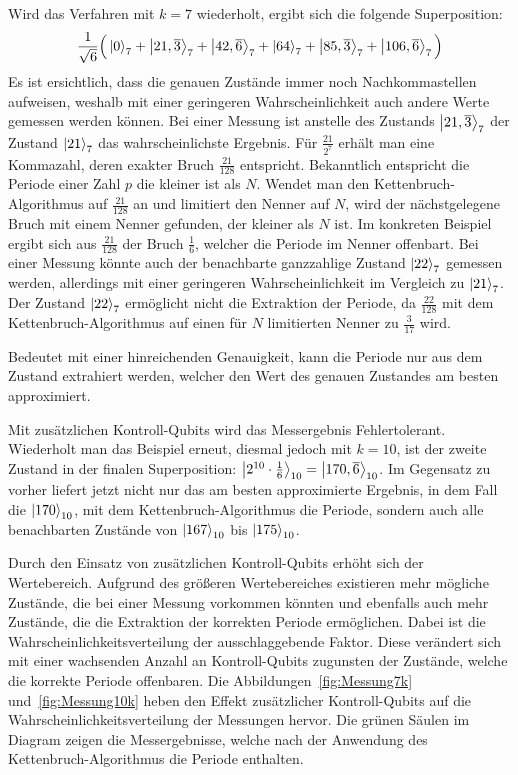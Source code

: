 Wird das Verfahren mit \(k=7\) wiederholt, ergibt sich die folgende Superposition:
\[\frac{1}{\sqrt{6}}
\Big(\ket{0}_7 +\ket{21,\overline{3}}_7 + \ket{42,\overline{6}}_7+
\ket{64}_7+\ket{85,\overline{3}}_7 + \ket{106,\overline{6}}_7
\Big) \]
Es ist ersichtlich, dass die genauen Zustände immer noch Nachkommastellen aufweisen, 
weshalb mit einer geringeren Wahrscheinlichkeit auch andere Werte gemessen werden können.
Bei einer Messung ist anstelle des Zustands \(\ket{21,\overline{3}}_7\) der Zustand \(\ket{21}_7\) das wahrscheinlichste Ergebnis.
Für \(\frac{21}{2^{7}}\) erhält man eine Kommazahl, deren exakter Bruch \(\frac{21}{128}\) entspricht.
Bekanntlich entspricht die Periode einer Zahl \(p\) die kleiner ist als \(N\).
Wendet man den Kettenbruch-Algorithmus auf \(\frac{21}{128}\) an und limitiert den Nenner auf \(N\), 
wird der nächstgelegene Bruch mit einem Nenner gefunden, der kleiner als \(N\) ist.
Im konkreten Beispiel ergibt sich aus \(\frac{21}{128}\) der Bruch \(\frac{1}{6}\), 
welcher die Periode im Nenner offenbart.
Bei einer Messung könnte auch der benachbarte ganzzahlige Zustand \(\ket{22}_7\) gemessen werden, 
allerdings mit einer geringeren Wahrscheinlichkeit im Vergleich zu \(\ket{21}_7\).
Der Zustand \(\ket{22}_7\) ermöglicht nicht die Extraktion der Periode, 
da \(\frac{22}{128}\) mit dem Kettenbruch-Algorithmus auf einen für \(N\) limitierten Nenner
zu \(\frac{3}{17}\) wird.

Bedeutet mit einer hinreichenden Genauigkeit, kann die Periode nur aus dem Zustand extrahiert werden, 
welcher den Wert des genauen Zustandes am besten approximiert.

Mit zusätzlichen Kontroll-Qubits wird das Messergebnis Fehlertolerant.
Wiederholt man das Beispiel erneut, diesmal jedoch mit \(k=10\), 
ist der zweite Zustand in der finalen Superposition: 
\(\ket{2^{10} \cdot \frac{1}{6}}_{10} =\ket{170,\overline{6}}_{10}\).
Im Gegensatz zu vorher liefert jetzt nicht nur das am besten approximierte Ergebnis, 
in dem Fall die \(\ket{170}_{10}\), mit dem Kettenbruch-Algorithmus die Periode, 
sondern auch alle benachbarten Zustände von \(\ket{167}_{10}\) bis \(\ket{175}_{10}\).

Durch den Einsatz von zusätzlichen Kontroll-Qubits erhöht sich der Wertebereich. 
Aufgrund des größeren Wertebereiches existieren mehr mögliche Zustände, 
die bei einer Messung vorkommen könnten und ebenfalls auch mehr Zustände, 
die die Extraktion der korrekten Periode ermöglichen. 
Dabei ist die Wahrscheinlichkeitsverteilung der ausschlaggebende Faktor. 
Diese verändert sich mit einer wachsenden Anzahl an Kontroll-Qubits zugunsten der Zustände, 
welche die korrekte Periode offenbaren.
Die Abbildungen~\ref{fig:Messung7k} und~\ref{fig:Messung10k} 
heben den Effekt zusätzlicher Kontroll-Qubits auf die Wahrscheinlichkeitsverteilung der Messungen hervor.
Die grünen Säulen im Diagram zeigen die Messergebnisse, 
welche nach der Anwendung des Kettenbruch-Algorithmus die Periode enthalten.

